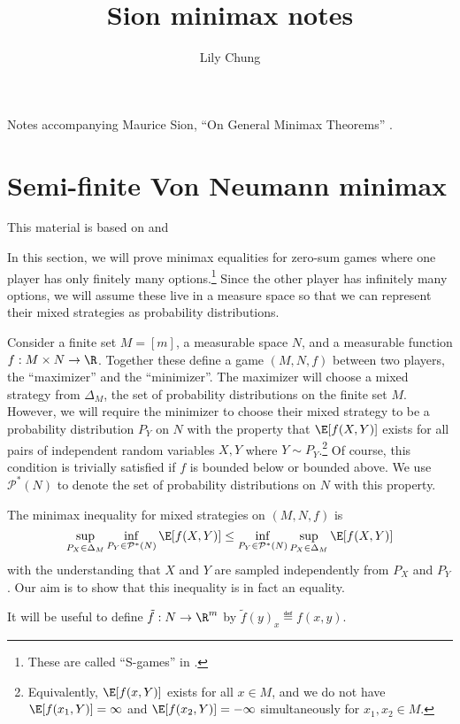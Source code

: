 \documentclass{article}
\title{Sion minimax notes}
\author{Lily Chung}
\date{}
\newcommand*{\Probstar}[1]{\mathcal{P}^*({#1})}
\newcommand*{\Probfin}[1]{\Delta_{#1}}
\begin{document}
\maketitle

Notes accompanying Maurice Sion, ``On General Minimax Theorems'' \cite{Sion1958}.

\section*{Semi-finite Von Neumann minimax}

This material is based on \cite[Sections 2.3--2.4]{Blackwell1954} and \cite[Section 13.1]{Ferguson2020}

In this section, we will prove minimax equalities for zero-sum games where one player has only finitely many options.\footnote{These are called ``S-games'' in \cite{Blackwell1954}.}
Since the other player has infinitely many options,
we will assume these live in a measure space so that we can
represent their mixed strategies as probability distributions.

Consider a finite set $M = [m]$, a measurable space $N$, and a measurable function $f : M \times N \to \R$.
Together these define a game $(M, N, f)$ between two players, the ``maximizer'' and the ``minimizer''.
The maximizer will choose a mixed strategy from $\Probfin{M}$, the set of probability distributions on the finite set $M$.
However, we will require the minimizer to choose their mixed strategy to be a probability distribution $P_Y$ on $N$ with the property that $\E[f(X, Y)]$ exists for all pairs of independent random variables $X, Y$ where $Y \sim P_Y$.\footnote{Equivalently, $\E[f(x, Y)]$ exists for all $x \in M$, and we do not have $\E[f(x_1, Y)] = \infty$ and $\E[f(x_2, Y)] = -\infty$ simultaneously for $x_1, x_2 \in M$.}
Of course, this condition is trivially satisfied if $f$ is bounded below or bounded above.
We use $\Probstar{N}$ to denote the set of probability distributions on $N$ with this property.

The minimax inequality for mixed strategies on $(M, N, f)$ is
\[\sup_{P_X \in \Probfin{M}} \inf_{P_Y \in \Probstar{N}} \E[f(X, Y)] \le \inf_{P_Y \in \Probstar{N}} \sup_{P_X \in \Probfin{M}} \E[f(X, Y)]\]
with the understanding that $X$ and $Y$ are sampled independently from $P_X$ and $P_Y$.
Our aim is to show that this inequality is in fact an equality.

It will be useful to define $\tilde f : N \to \R^m$ by $\tilde f(y)_x \eqdef f(x, y)$.
\end{document}
